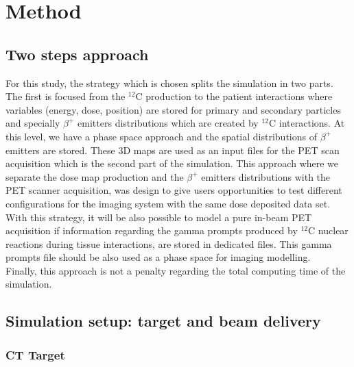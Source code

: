 \documentclass[11pt]{iopart}
\begin{document}
\section{Method}




\subsection{Two steps approach}

For this study, the strategy which is chosen splits the simulation in two parts. The first is focused from the $^{12}$C production to the patient interactions where variables (energy, dose, position) are stored for primary and secondary particles and specially $\beta^+$ emitters distributions which are created by $^{12}$C interactions. At this level, we have a phase space approach and the spatial distributions of $\beta^+$ emitters are stored. These 3D maps are used as an input files for the PET scan acquisition which is the second part of the simulation. This approach where we separate the dose map production and the $\beta^+$ emitters distributions with the PET scanner acquisition, was design to give users opportunities to test different configurations for the imaging system with the same dose deposited data set. With this strategy, it will be also possible to model a pure in-beam PET acquisition if information regarding the gamma prompts produced by $^{12}$C nuclear reactions during tissue interactions, are stored in dedicated files. This gamma prompts file should be also used as a phase space for imaging modelling.\\
Finally, this approach is not a penalty regarding the total computing time of the simulation.     


\subsection{Simulation setup: target and beam delivery}

\subsubsection{CT Target}
\end{document}

